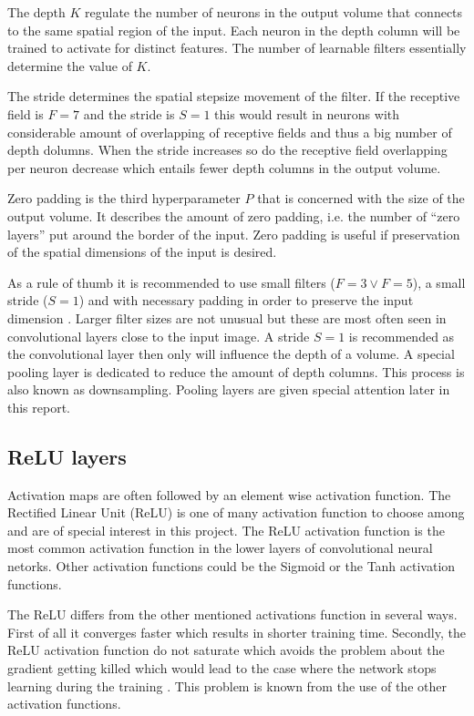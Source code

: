 The depth $K$ regulate the number of neurons in the output volume that connects to the same spatial region of the input. Each neuron in the depth column will be trained to activate for distinct features. The number of learnable filters essentially determine the value of $K$.

The stride determines the spatial stepsize movement of the filter. If the receptive field is $F = 7$ and the stride is $S = 1$ this would result in neurons with considerable amount of overlapping of receptive fields and thus a big number of depth dolumns. When the stride increases so do the receptive field overlapping per neuron decrease which entails fewer depth columns in the output volume. 

Zero padding is the third hyperparameter $P$ that is concerned with the size of the output volume. It describes the amount of zero padding, i.e. the number of ``zero layers'' put around the border of the input. Zero padding is useful if preservation of the spatial dimensions of the input is desired. 

As a rule of thumb it is recommended to use small filters ($F=3 \vee F=5$), a small stride ($S=1$) and with necessary padding in order to preserve the input dimension \cite{cs231n}. Larger filter sizes are not unusual but these are most often seen in convolutional layers close to the input image. A stride $S=1$ is recommended as the convolutional layer then only will influence the depth of a volume. A special pooling layer is dedicated to reduce the amount of depth columns. This process is also known as downsampling. Pooling layers are given special attention later in this report.

\subsection{ReLU layers} %
\label{sub:relu_layers}

Activation maps are often followed by an element wise activation function. The Rectified Linear Unit (ReLU) is one of many activation function to choose among and are of special interest in this project. The ReLU activation function is the most common activation function in the lower layers of convolutional neural netorks. Other activation functions could be the Sigmoid or the Tanh activation functions.

The ReLU differs from the other mentioned activations function in several ways. First of all it converges faster which results in shorter training time. Secondly, the ReLU activation function do not saturate which avoids the problem about the gradient getting killed which would lead to the case where the network stops learning during the training \cite{cs231n}. This problem is known from the use of the other activation functions. 

